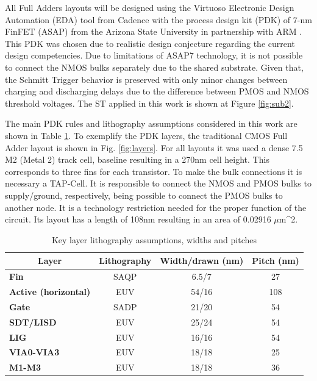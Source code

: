 \documentclass[ecp,tc, english]{iiufrgs}
\begin{document}
All Full Adders layouts will be designed using the Virtuoso Electronic Design Automation (EDA) tool from Cadence\textregistered{} with the process design kit (PDK) of 7-nm FinFET (ASAP) from the Arizona State University in partnership with ARM \cite{clark2016asap7}. This PDK was chosen due to realistic design conjecture regarding the current design competencies. Due to limitations of ASAP7 technology, it is not possible to connect the NMOS bulks separately due to the shared substrate. Given that, the Schmitt Trigger behavior is preserved with only minor changes between charging and discharging delays due to the difference between PMOS and NMOS threshold voltages. The ST applied in this work is shown at Figure \ref{fig:sub2}.

The main PDK rules and lithography assumptions considered in this work are shown in Table \ref{layers}. To exemplify the PDK layers, the traditional CMOS Full Adder layout is shown in Fig. \ref{fig:layers}. For all layouts it was used a dense 7.5 M2 (Metal 2) track cell, baseline resulting in a 270nm cell height. This corresponds to three fins for each transistor. To make the bulk connections it is necessary a TAP-Cell. It is responsible to connect the NMOS and PMOS bulks to supply/ground, respectively, being possible to connect the PMOS bulks to another node. It is a technology restriction needed for the proper function of the circuit. Its layout has a length of 108nm resulting in an area of 0.02916 \(\mu\)m^{2}.

\begin{table}[]
\centering
\caption{Key layer lithography assumptions, widths and pitches}
\label{layers}
\begin{tabular}{|l|c|c|c|}
\hline
\multicolumn{1}{|c|}{\textbf{Layer}} & \textbf{Lithography} & \textbf{Width/drawn (nm)} & \textbf{Pitch (nm)} \\ \hline
\textbf{Fin}                         & SAQP                 & 6.5/7                     & 27                  \\ \hline
\textbf{Active (horizontal)}         & EUV                  & 54/16                     & 108                 \\ \hline
\textbf{Gate}                        & SADP                 & 21/20                     & 54                  \\ \hline
\textbf{SDT/LISD}                    & EUV                  & 25/24                     & 54                  \\ \hline
\textbf{LIG}                         & EUV                  & 16/16                     & 54                  \\ \hline
\textbf{VIA0-VIA3}                   & EUV                  & 18/18                     & 25                  \\ \hline
\textbf{M1-M3}                       & EUV                  & 18/18                     & 36                  \\ \hline
\end{tabular}
\end{table}
\end{document}
